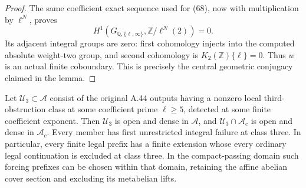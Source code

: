 \begin{proof}
The same coefficient exact sequence used for (68),
now with multiplication by \(\ell^N\), proves
\[
 H^1(G_{\mathbb Q,\{\ell,\infty\}},
                       \mathbb Z/\ell^N(2))=0.
\]
Its adjacent integral groups are zero: first
cohomology injects into the computed absolute
weight-two group, and second cohomology is
\(K_2(\mathbb Z)\{\ell\}=0\).
Thus \(w\) is an actual finite coboundary.
This is precisely the central geometric conjugacy
claimed in the lemma.
\end{proof}

\begin{corollary}
\label{cor:ghost-open-dense-class3}
Let \(\mathscr U_3\subset\mathscr A\) consist of
the original A.44 outputs having a nonzero local
third-obstruction class at some coefficient prime
\(\ell\ge5\), detected at some finite coefficient
exponent. Then \(\mathscr U_3\) is open and dense
in \(\mathscr A\), and
\(\mathscr U_3\cap\mathscr A_c\) is open and
dense in \(\mathscr A_c\).
Every member has first unrestricted integral
failure at class three. In particular, every finite
legal prefix has a finite extension whose every
ordinary legal continuation is excluded at class
three. In the compact-passing domain such forcing
prefixes can be chosen within that domain, retaining
the affine abelian cover section and excluding its
metabelian lifts.
\end{corollary}

